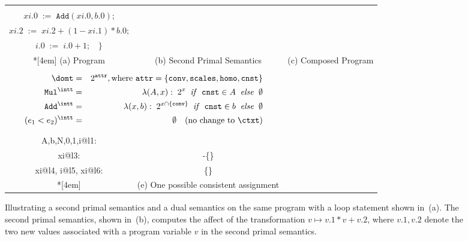 \documentclass[preprint]{sig-alternate-05-2015}
\def\MMul{{\mathtt{Mul}}}
\def\VAdd{{\mathtt{Add}}}
\def\conv{{\mathtt{conv}}}
\def\scales{{\mathtt{scales}}}
\def\homo{{\mathtt{homo}}}
\def\cnst{{\mathtt{cnst}}}
\def\attr{{\mathtt{attr}}}
\def\iteif{{\mathit{if}}}
\def\iteelse{{\mathit{else}}}
\begin{document}
{\begin{figure}[htp]
\begin{tabular}{ccc}
\begin{minipage}{50mm}
\begin{tabbing}
          $xi.0 \; := \; \MMul(A.0, xi.0)$;
          $xi.2 \; := \; A.0*x.2$; \\ \> \>
          $xi.0 \; := \; \VAdd(xi.0, b.0)$; \\ \> \>
          $xi.2 \; := \; xi.2+(1-xi.1)*b.0$; \\ \> \>
        $i.0 \; := \; i.0 + 1;\;\;$ $\}$ %
      \end{tabbing}
    \end{minipage}
    \\*[4em]
    (a) Program & (b) Second Primal Semantics & (c) Composed Program
    \\
    \multicolumn{2}{c|}{
    \begin{minipage}{95mm}
      \begin{eqnarray*}
        \domt & = & 2^\attr, \mbox{where } \attr={\{\conv,\scales,\homo,\cnst\}} \\
   \MMul^\intt & = & \lambda(A,x):\; 2^x \;\;\iteif\;\; \cnst\in A\;\; \iteelse\;\;\emptyset\\
   \VAdd^\intt & = & \lambda(x,b):\; 2^{x\cap\{\conv\}}\;\; \iteif\;\; \cnst\in b\;\; \iteelse \;\; \emptyset \\
   (e_1 < e_2)^\intt & = & \emptyset\quad({\mbox{no change to $\ctxt$}})
      \end{eqnarray*}
    \end{minipage}
    }
    &
    \begin{minipage}{60mm}
      \[
        \begin{array}{rl}
        x0: & \attr - \{\cnst\}
        \\
        A,b,N,0,1,i@l1:& \attr
        \\
        xi@l3:& \attr-\{\cnst\}
        \\
        xi@l4, i@l5, xi@l6:& \{\conv\}
      \end{array}
    \]
    \end{minipage}
    \\*[4em]
    \multicolumn{2}{c}{(d) Dual Semantics} &
    (e) One possible consistent assignment
  \end{tabular}
  \caption{Illustrating a second primal semantics and a dual semantics on the same program with a loop statement shown in~(a).
  The second primal semantics, shown in~(b), computes the affect of the transformation $v \mapsto v.1*v + v.2$, where $v.1,v.2$ denote the two new values associated with a program variable $v$ in the second primal semantics.
}
\end{figure}}
\end{document}
